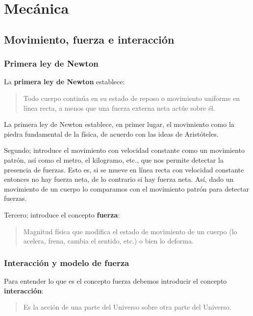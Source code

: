 \documentclass[../apunte_mecanica_clasica.tex]{subfiles}%
\begin{document}
\chapter{Mecánica}

\section{Movimiento, fuerza e interacción}

\subsection{Primera ley de Newton}

La \textbf{primera ley de Newton} establece:
\begin{quote}
Todo cuerpo continúa en su estado de reposo o movimiento uniforme en línea recta, a menos que una fuerza externa neta actúe sobre él.
\end{quote}

La primera ley de Newton establece, en primer lugar, el movimiento como la piedra fundamental de la física, de acuerdo con las ideas de Aristóteles.

Segundo; introduce el movimiento con velocidad constante como un movimiento patrón, así como el metro, el kilogramo, etc., que nos permite detectar la presencia de fuerzas. Esto es, si se mueve en línea recta con velocidad constante entonces no hay fuerza neta, de lo contrario si hay fuerza neta. Así, dado un movimiento de un cuerpo lo comparamos con el movimiento patrón para detectar fuerzas.

Tercero; introduce el concepto \textbf{fuerza}:
\begin{quote}
Magnitud física que modifica el estado de movimiento de un cuerpo (lo acelera, frena, cambia el sentido, etc.) o bien lo deforma.
\end{quote}

\subsection{Interacción y modelo de fuerza}

Para entender lo que es el concepto fuerza debemos introducir el concepto \textbf{interacción}:
\begin{quote}
Es la acción de una parte del Universo sobre otra parte del Universo.
\end{quote}
\end{document}
